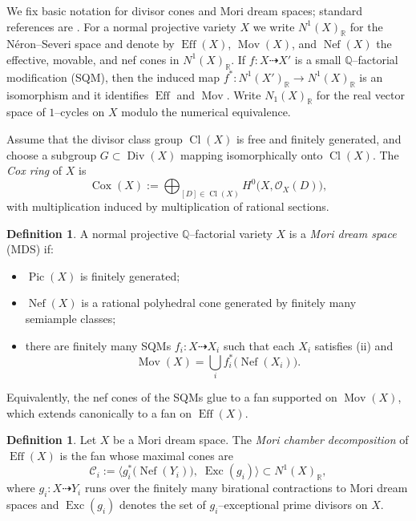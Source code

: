 \documentclass[10pt]{amsart}
\theoremstyle{definition}
\newtheorem{definition}[theorem]{Definition}
\newcommand{\Q}{\mathbb{Q}}
\newcommand{\R}{\mathbb{R}}
\newcommand{\OO}{\mathcal{O}}
\newcommand{\Pic}{\operatorname{Pic}}
\newcommand{\Eff}{\operatorname{Eff}}
\newcommand{\Nef}{\operatorname{Nef}}
\newcommand{\Mov}{\operatorname{Mov}}
\DeclareMathOperator{\Cox}{Cox}
\DeclareMathOperator{\Cl}{Cl}
\DeclareMathOperator{\Div}{Div}
\DeclareMathOperator{\Exc}{Exc}
\theoremstyle{plain} %
\begin{document}
We fix basic notation for divisor cones and Mori dream spaces; standard references are
\cite{HK00,ADHL15,Br93,Pe14}.
For a normal projective variety $X$ we write $N^1(X)_\R$ for the N\'eron--Severi space and denote by
$\Eff(X)$, $\Mov(X)$, and $\Nef(X)$ the effective, movable, and nef cones in $N^1(X)_\R$.
If $f\colon X\dasharrow X'$ is a small $\Q$--factorial modification (SQM), then the induced map
$f^*\colon N^1(X')_\R\to N^1(X)_\R$ is an isomorphism and it identifies $\Eff$ and $\Mov$.  Write $N_1(X)_{\mathbb R}$ for the real vector space of $1$--cycles on $X$ modulo the numerical equivalence.


Assume that the divisor class group $\Cl(X)$ is free and finitely generated, and choose a subgroup
$G\subset \Div(X)$ mapping isomorphically onto $\Cl(X)$.
The \emph{Cox ring} of $X$ is
\[
\Cox(X):=\bigoplus_{[D]\in \Cl(X)} H^0\bigl(X,\OO_X(D)\bigr),
\]
with multiplication induced by multiplication of rational sections.

\begin{definition}\label{def:MDS}
A normal projective $\Q$--factorial variety $X$ is a \emph{Mori dream space} (MDS) if:
\begin{itemize}
  \item[(i)] $\Pic(X)$ is finitely generated;
  \item[(ii)] $\Nef(X)$ is a rational polyhedral cone generated by finitely many semiample classes;
  \item[(iii)] there are finitely many SQMs $f_i\colon X\dasharrow X_i$ such that each $X_i$ satisfies (ii) and
  \[
  \Mov(X)=\bigcup_i f_i^*\bigl(\Nef(X_i)\bigr).
  \]
\end{itemize}
Equivalently, the nef cones of the SQMs glue to a fan supported on $\Mov(X)$, which extends canonically to a fan on $\Eff(X)$.
\end{definition}

\begin{definition}\label{MCD}
Let $X$ be a Mori dream space.
The \emph{Mori chamber decomposition} of $\Eff(X)$ is the fan whose maximal cones are
\[
\mathcal{C}_i:=\big\langle g_i^*\bigl(\Nef(Y_i)\bigr),\;\Exc(g_i)\big\rangle\subset N^1(X)_\R,
\]
where $g_i\colon X\dasharrow Y_i$ runs over the finitely many birational contractions to Mori dream spaces and
$\Exc(g_i)$ denotes the set of $g_i$--exceptional prime divisors on $X$.
\end{definition}
\end{document}
